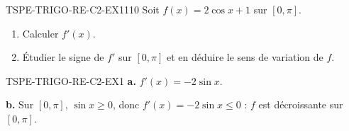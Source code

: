

\begin{exercice}{TSPE-TRIGO-RE-C2-EX1}{1}{10}
Soit $f(x) = 2\cos x + 1$ sur $[0, \pi]$.
\begin{enumerate}
  \item Calculer $f'(x)$.
  \item Étudier le signe de $f'$ sur $[0,\pi]$ et en déduire le sens de variation de $f$.
\end{enumerate}
\end{exercice}


\begin{corrige}{TSPE-TRIGO-RE-C2-EX1}
\textbf{a.} $f'(x) = -2\sin x$.

\textbf{b.} Sur $[0,\pi]$, $\sin x \geq 0$, donc $f'(x) = -2\sin x \leq 0$ : $f$ est décroissante sur $[0,\pi]$.
\end{corrige}
